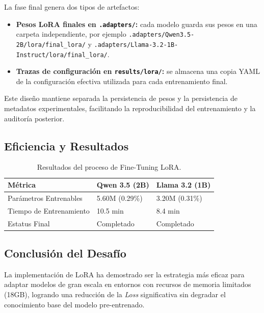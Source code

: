 La fase final genera dos tipos de artefactos:
\begin{itemize}
    \item \textbf{Pesos LoRA finales en \texttt{.adapters/}:} cada modelo guarda sus pesos en una carpeta independiente, por ejemplo \texttt{.adapters/Qwen3.5-2B/lora/final\_lora/} y \texttt{.adapters/Llama-3.2-1B-Instruct/lora/final\_lora/}.
    \item \textbf{Trazas de configuración en \texttt{results/lora/}:} se almacena una copia YAML de la configuración efectiva utilizada para cada entrenamiento final.
\end{itemize}

Este diseño mantiene separada la persistencia de pesos y la persistencia de metadatos experimentales, facilitando la reproducibilidad del entrenamiento y la auditoría posterior.

\subsection{Eficiencia y Resultados}

\begin{table}[H]
    \centering
    \begin{tabularx}{\textwidth}{|l|X|X|}
        \hline
        \textbf{Métrica}          & \textbf{Qwen 3.5 (2B)}  & \textbf{Llama 3.2 (1B)}    \\ \hline
        Parámetros Entrenables  & 5.60M (0.29\%)          & 3.20M (0.31\%)                \\ \hline
        Tiempo de Entrenamiento  & 10.5 min                & 8.4 min                      \\ \hline
        Estatus Final           & Completado              & Completado                    \\ \hline
    \end{tabularx}
    \caption{Resultados del proceso de Fine-Tuning LoRA.}
    \label{tab:lora_final}
\end{table}

\subsection{Conclusión del Desafío}

La implementación de LoRA ha demostrado ser la estrategia más eficaz para adaptar modelos de gran escala en entornos con recursos de memoria limitados (18GB), logrando una reducción de la \textit{Loss} significativa sin degradar el conocimiento base del modelo pre-entrenado.
